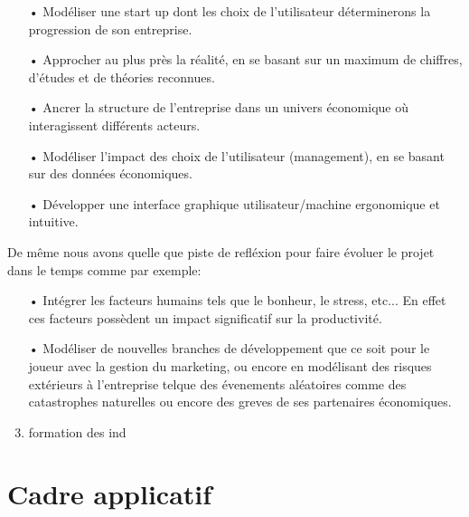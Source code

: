 \begin{enumerate}
\item[•] Modéliser une start up dont les choix de l’utilisateur déterminerons la
progression de son entreprise.
\item[•] Approcher au plus près la réalité, en se basant sur un maximum de chiffres, d’études et
de théories reconnues.
\item[•] Ancrer la structure de l’entreprise dans un univers économique où interagissent différents
acteurs.
\item[•] Modéliser l’impact des choix de l’utilisateur (management), en se basant sur des données
économiques.
\item[•] Développer une interface graphique utilisateur/machine ergonomique et intuitive.\\
\end{enumerate}
De même nous avons quelle que piste de refléxion pour faire évoluer le projet dans le temps comme par exemple:
\begin{enumerate}
\item[•] Intégrer les facteurs humains tels que le bonheur, le stress, etc... En effet ces facteurs
possèdent un impact significatif sur la productivité.
\item[•] Modéliser de nouvelles branches de développement que ce soit pour le joueur avec la gestion du marketing, ou encore en modélisant des risques extérieurs à l'entreprise telque des évenements aléatoires comme des catastrophes naturelles ou encore des greves de ses partenaires économiques.
\item formation des ind
\end{enumerate}



\clearpage



\section{Cadre applicatif}




